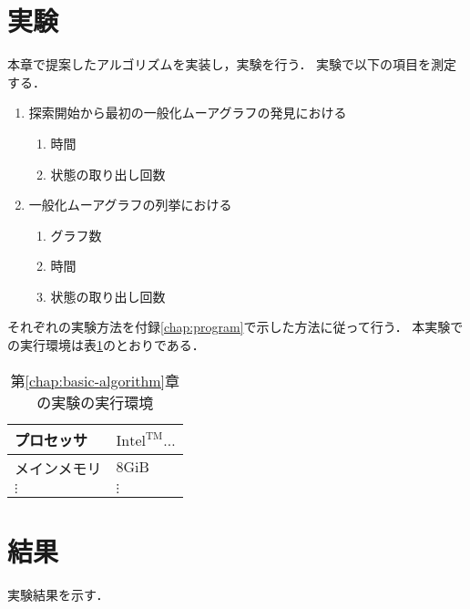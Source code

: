 \section{実験}
\label{sect:exp-basic-algorithm}
本章で提案したアルゴリズムを実装し，実験を行う．
実験で以下の項目を測定する．
\begin{enumerate}
\item 探索開始から最初の一般化ムーアグラフの発見における
  \begin{enumerate}
  \item 時間
  \item 状態の取り出し回数
  \end{enumerate}
\item 一般化ムーアグラフの列挙における
  \begin{enumerate}
  \item グラフ数
  \item 時間
  \item 状態の取り出し回数
  \end{enumerate}
\end{enumerate}
それぞれの実験方法を付録\ref{chap:program}で示した方法に従って行う．
本実験での実行環境は表\ref{tab:basic-algorithm-env}のとおりである．
\begin{table}
  \caption{第\ref{chap:basic-algorithm}章の実験の実行環境}
  \label{tab:basic-algorithm-env}
  \centering
  \begin{tabular}{ll}
    \hline
    プロセッサ & $\mathrm{Intel^{TM}\ldots}$ \\ \hline
    メインメモリ & $8\mathrm{GiB}$ \\ \hline
    $\vdots$ & $\vdots$ \\ \hline
  \end{tabular}
\end{table}

\section{結果}
\label{sect:result-basic-algorithm}
実験結果を示す．

